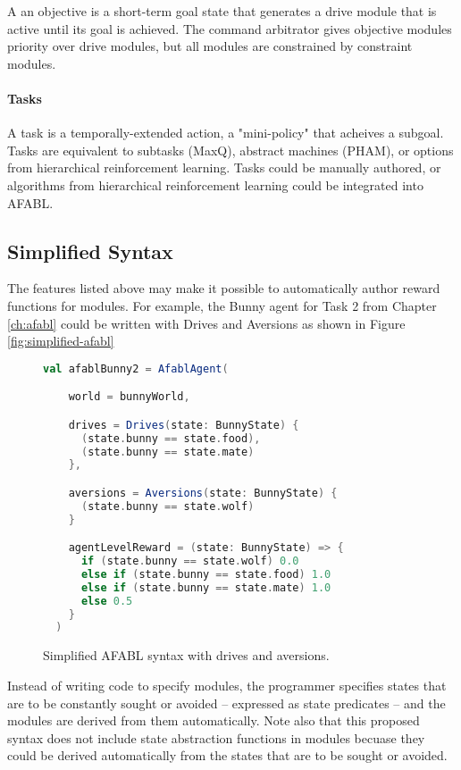 A an objective is a short-term goal state that generates a drive module that is active until its goal is achieved.  The command arbitrator gives objective modules priority over drive modules, but all modules are constrained by constraint modules.

\paragraph{Tasks}

A task is a temporally-extended action, a "mini-policy" that acheives a subgoal.  Tasks are equivalent to subtasks (MaxQ), abstract machines (PHAM), or options from hierarchical reinforcement learning. Tasks could be manually authored, or algorithms from hierarchical reinforcement learning could be integrated into AFABL.

\subsection{Simplified Syntax}

The features listed above may make it possible to automatically author reward functions for modules. For example, the Bunny agent for Task 2 from Chapter \ref{ch:afabl} could be written with Drives and Aversions as shown in Figure \ref{fig:simplified-afabl}


\begin{figure}[!h]
\begin{center}

\begin{lstlisting}[language=Scala]
  val afablBunny2 = AfablAgent(

    world = bunnyWorld,

    drives = Drives(state: BunnyState) {
      (state.bunny == state.food),
      (state.bunny == state.mate)
    },

    aversions = Aversions(state: BunnyState) {
      (state.bunny == state.wolf)
    }

    agentLevelReward = (state: BunnyState) => {
      if (state.bunny == state.wolf) 0.0
      else if (state.bunny == state.food) 1.0
      else if (state.bunny == state.mate) 1.0
      else 0.5
    }
  )
\end{lstlisting}

\caption{Simplified AFABL syntax with drives and aversions.}
\end{center}
\label{fig:dimplified-afabl}
\end{figure}


Instead of writing code to specify modules, the programmer specifies states that are to be constantly sought or avoided -- expressed as state predicates -- and the modules are derived from them automatically. Note also that this proposed syntax does not include state abstraction functions in modules becuase they could be derived automatically from the states that are to be sought or avoided.

